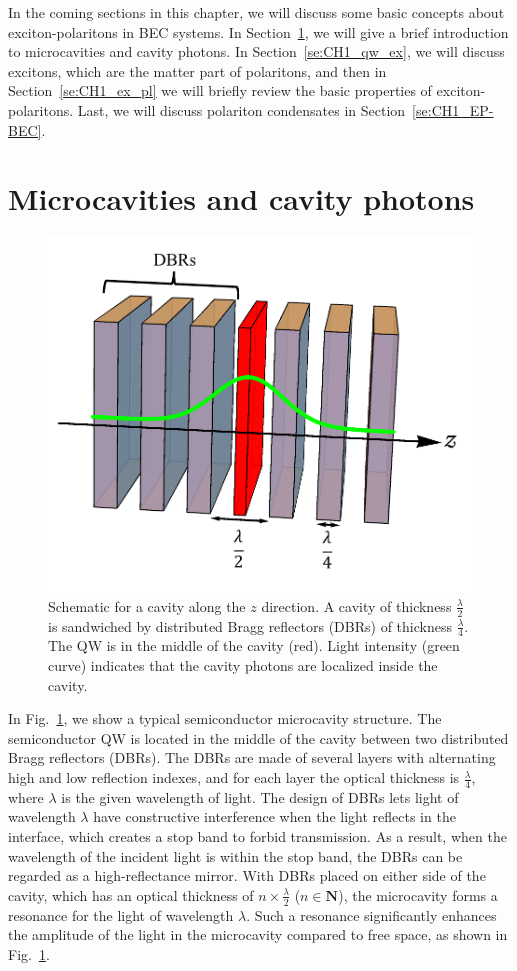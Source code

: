 In the coming sections in this chapter, we will discuss some basic concepts about exciton-polaritons in BEC systems.
In Section~\ref{se:Ch1_microcavity_and_cp}, we will give a brief introduction to microcavities and cavity photons.
In Section~\ref{se:CH1_qw_ex}, we will discuss excitons, which are the matter part of polaritons, and then in Section~\ref{se:CH1_ex_pl} we will briefly review the basic properties of exciton-polaritons.
Last, we will discuss polariton condensates in Section~\ref{se:CH1_EP-BEC}.


\section{Microcavities and cavity photons}\label{se:Ch1_microcavity_and_cp}
%
\begin{figure}[ht]
    \centering
    \includegraphics[width=0.55\linewidth]{Fig/Ch1/cavity3D.pdf}
    \caption[Microcavity schematic]{Schematic for a cavity along the $z$ direction. A cavity of thickness $\frac{\lambda}{2}$ is sandwiched by distributed Bragg reflectors (DBRs) of thickness $\frac{\lambda}{4}$. The QW is in the middle of the cavity (red). Light intensity (green curve) indicates that the cavity photons are localized inside the cavity.}
    \label{fig:Ch1_cavity}
\end{figure}
In Fig.~\ref{fig:Ch1_cavity}, we show a typical semiconductor microcavity structure.
The semiconductor QW is located in the middle of the cavity between two distributed Bragg reflectors (DBRs).
The DBRs are made of several layers with alternating high and low reflection indexes, and for each layer the optical thickness is $\frac{\lambda}{4}$, where $\lambda$ is the given wavelength of light.
The design of DBRs lets light of wavelength $\lambda$ have constructive interference when the light reflects in the interface, which creates a stop band to forbid transmission.
As a result, when the wavelength of the incident light is within the stop band, the DBRs can be regarded as a high-reflectance mirror.
With DBRs placed on either side of the cavity, which has an optical thickness of $n\times\frac{\lambda}{2}$ ($n\in \mathbf{N}$), the microcavity forms a resonance for the light of wavelength $\lambda$.
Such a resonance significantly enhances the amplitude of the light in the microcavity compared to free space, as shown in Fig.~\ref{fig:Ch1_cavity}.

